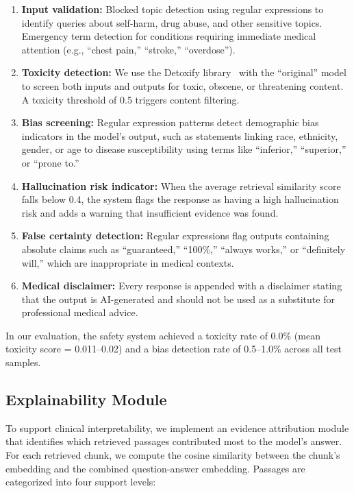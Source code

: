 \documentclass[conference]{IEEEtran}
\begin{document}
\begin{enumerate}[leftmargin=*]
    \item \textbf{Input validation:} Blocked topic detection using regular expressions to identify queries about self-harm, drug abuse, and other sensitive topics. Emergency term detection for conditions requiring immediate medical attention (e.g., ``chest pain,'' ``stroke,'' ``overdose'').

    \item \textbf{Toxicity detection:} We use the Detoxify library~\cite{detoxify2020} with the ``original'' model to screen both inputs and outputs for toxic, obscene, or threatening content. A toxicity threshold of 0.5 triggers content filtering.

    \item \textbf{Bias screening:} Regular expression patterns detect demographic bias indicators in the model's output, such as statements linking race, ethnicity, gender, or age to disease susceptibility using terms like ``inferior,'' ``superior,'' or ``prone to.''

    \item \textbf{Hallucination risk indicator:} When the average retrieval similarity score falls below 0.4, the system flags the response as having a high hallucination risk and adds a warning that insufficient evidence was found.

    \item \textbf{False certainty detection:} Regular expressions flag outputs containing absolute claims such as ``guaranteed,'' ``100\%,'' ``always works,'' or ``definitely will,'' which are inappropriate in medical contexts.

    \item \textbf{Medical disclaimer:} Every response is appended with a disclaimer stating that the output is AI-generated and should not be used as a substitute for professional medical advice.
\end{enumerate}

In our evaluation, the safety system achieved a toxicity rate of 0.0\% (mean toxicity score = 0.011--0.02) and a bias detection rate of 0.5--1.0\% across all test samples.

\subsection{Explainability Module}

To support clinical interpretability, we implement an evidence attribution module that identifies which retrieved passages contributed most to the model's answer. For each retrieved chunk, we compute the cosine similarity between the chunk's embedding and the combined question-answer embedding. Passages are categorized into four support levels:
\end{document}
